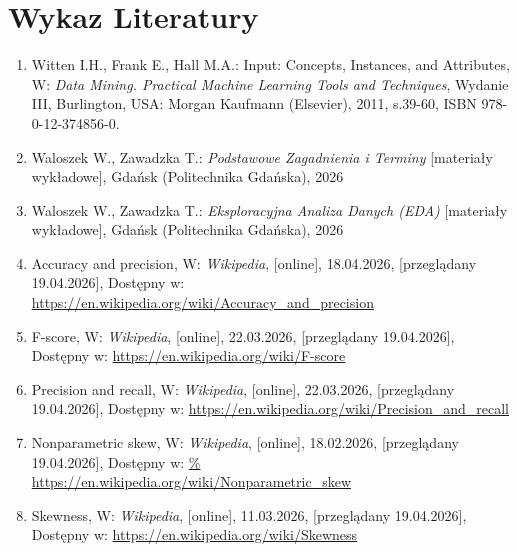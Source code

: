 \documentclass[12pt, a4paper]{report}
\begin{document}
\section*{Wykaz Literatury}
\renewcommand{\labelenumi}{[\arabic{enumi}]}
\begin{enumerate}

\item Witten I.H., Frank E., Hall M.A.: Input: Concepts, Instances, and Attributes, W: \textit{Data Mining. Practical Machine Learning Tools and Techniques}, Wydanie III, Burlington, USA: Morgan Kaufmann (Elsevier), 2011, s.39-60, ISBN 978-0-12-374856-0.

\item Waloszek W., Zawadzka T.: \textit{Podstawowe Zagadnienia i Terminy} [materiały wykładowe], Gdańsk (Politechnika Gdańska), 2026
\item Waloszek W., Zawadzka T.: \textit{Eksploracyjna Analiza Danych (EDA)} [materiały wykładowe], Gdańsk (Politechnika Gdańska), 2026

\item  Accuracy and precision, W: \textit{Wikipedia}, [online], 18.04.2026, [przeglądany 19.04.2026], Dostępny w: \url{https://en.wikipedia.org/wiki/Accuracy_and_precision}

\item  F-score, W: \textit{Wikipedia}, [online], 22.03.2026, [przeglądany 19.04.2026], Dostępny w: \url{https://en.wikipedia.org/wiki/F-score}

\item  Precision and recall, W: \textit{Wikipedia}, [online], 22.03.2026, [przeglądany 19.04.2026], Dostępny w: \url{https://en.wikipedia.org/wiki/Precision_and_recall}

\item  Nonparametric skew, W: \textit{Wikipedia}, [online], 18.02.2026, [przeglądany 19.04.2026], Dostępny w: \url{% https://en.wikipedia.org/wiki/Nonparametric_skew}

\item  Skewness, W: \textit{Wikipedia}, [online], 11.03.2026, [przeglądany 19.04.2026], Dostępny w: \url{https://en.wikipedia.org/wiki/Skewness}


\end{enumerate}
\end{document}
